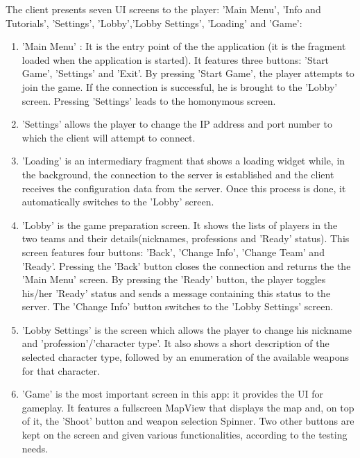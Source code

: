 The client presents seven UI screens to the player: 'Main Menu', 'Info and
Tutorials', 'Settings', 'Lobby','Lobby Settings', 'Loading' and 'Game':

\begin{enumerate}
  \item 'Main Menu' : It is the entry point of the the application (it is the
  fragment loaded when the application is started). It features three buttons:
  'Start Game', 'Settings' and 'Exit'. By pressing 'Start Game', the player
  attempts to join the game. If the connection is successful, he is brought to
  the 'Lobby' screen. Pressing 'Settings' leads to the homonymous screen.
  
  \item 'Settings' allows the player to change the IP address and port
  number to which the client will attempt to connect.
  
  \item 'Loading' is an intermediary fragment that shows a loading widget
  while, in the background, the connection to the server is established
  and the client receives the configuration data from the server. Once
  this process is done, it automatically switches to the 'Lobby' screen.
  
  \item 'Lobby' is the game preparation screen. It shows the lists of players in
  the two teams and their details(nicknames, professions and 'Ready' status).
  This screen features four buttons: 'Back', 'Change Info', 'Change Team' and
  'Ready'. Pressing the 'Back' button closes the connection and returns the
  the 'Main Menu' screen. By pressing the 'Ready' button, the player toggles
  his/her 'Ready' status and sends a message containing this status to the
  server. The 'Change Info' button switches to the 'Lobby Settings' screen.  
  
  \item 'Lobby Settings' is the screen which allows the player to change his
  nickname and 'profession'/'character type'. It also shows a short description
  of the selected character type, followed by an enumeration of the available
  weapons for that character.
  
  \item 'Game' is the most important screen in this app: it provides the UI
  for gameplay. It features a fullscreen MapView that displays the map and, on
  top of it, the 'Shoot' button and weapon selection Spinner. Two other buttons
  are kept on the screen and given various functionalities, according to the
  testing needs.
   
\end{enumerate}

